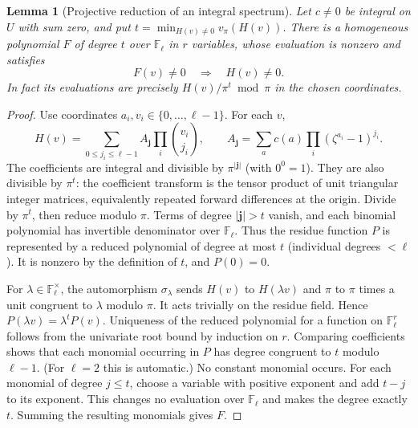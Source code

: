 \documentclass[11pt]{article}
\newtheorem{lemma}[theorem]{Lemma}
\theoremstyle{remark}\newtheorem{remark}[theorem]{Remark}
\newcommand{\F}{\mathbb F}
\begin{document}
\begin{lemma}[Projective reduction of an integral spectrum]\label{lem:projective}
Let $c\ne0$ be integral on $U$ with sum zero, and put $t=\min_{H(v)\ne0}v_\pi(H(v))$. There is a homogeneous polynomial $F$ of degree $t$ over $\F_\ell$ in $r$ variables, whose evaluation is nonzero and satisfies
\[
 F(v)\ne0\quad\Longrightarrow\quad H(v)\ne0.
\]
In fact its evaluations are precisely $H(v)/\pi^t\bmod\pi$ in the chosen coordinates.
\end{lemma}
\begin{proof}
Use coordinates $a_i,v_i\in\{0,\ldots,\ell-1\}$. For each $v$,
\[
 H(v)=\sum_{0\le j_i\le\ell-1} A_{\mathbf j}\prod_i\binom{v_i}{j_i},\qquad
 A_{\mathbf j}=\sum_a c(a)\prod_i(\zeta^{a_i}-1)^{j_i}.
\]
The coefficients are integral and divisible by $\pi^{|\mathbf j|}$ (with $0^0=1$). They are also divisible by $\pi^t$: the coefficient transform is the tensor product of unit triangular integer matrices, equivalently repeated forward differences at the origin. Divide by $\pi^t$, then reduce modulo $\pi$. Terms of degree $|\mathbf j|>t$ vanish, and each binomial polynomial has invertible denominator over $\F_\ell$. Thus the residue function $P$ is represented by a reduced polynomial of degree at most $t$ (individual degrees $<\ell$). It is nonzero by the definition of $t$, and $P(0)=0$.

For $\lambda\in\F_\ell^\times$, the automorphism $\sigma_\lambda$ sends $H(v)$ to $H(\lambda v)$ and $\pi$ to $\pi$ times a unit congruent to $\lambda$ modulo $\pi$. It acts trivially on the residue field. Hence $P(\lambda v)=\lambda^t P(v)$. Uniqueness of the reduced polynomial for a function on $\F_\ell^r$ follows from the univariate root bound by induction on $r$. Comparing coefficients shows that each monomial occurring in $P$ has degree congruent to $t$ modulo $\ell-1$. (For $\ell=2$ this is automatic.) No constant monomial occurs. For each monomial of degree $j\le t$, choose a variable with positive exponent and add $t-j$ to its exponent. This changes no evaluation over $\F_\ell$ and makes the degree exactly $t$. Summing the resulting monomials gives $F$.
\end{proof}
\end{document}
